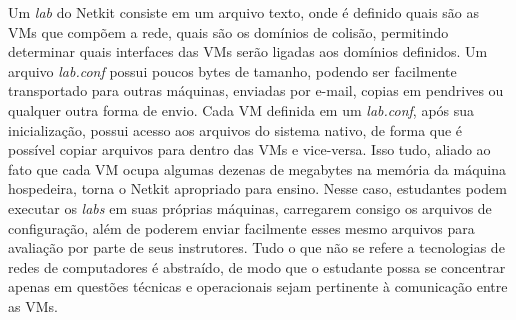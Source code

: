 \documentclass[	12pt, Times, openright, twoside, a4paper, english, brazil]{abntex2}
\begin{document}

Um \textit{lab} do Netkit consiste em um arquivo texto, onde é definido quais são as VMs que compõem a rede, quais são os domínios de colisão, permitindo determinar quais interfaces das VMs serão ligadas aos domínios definidos. Um arquivo  \textit{lab.conf} possui poucos bytes de tamanho, podendo ser facilmente transportado para outras máquinas, enviadas por e-mail, copias em pendrives ou qualquer outra forma de envio. Cada VM definida em um \textit{lab.conf}, após sua inicialização, possui acesso aos arquivos do sistema nativo, de forma que é possível copiar arquivos para dentro das VMs e vice-versa. Isso tudo, aliado ao fato que cada VM ocupa algumas dezenas de megabytes na memória da máquina hospedeira, torna o Netkit apropriado para ensino. Nesse caso, estudantes podem executar os \textit{labs} em suas próprias máquinas, carregarem consigo os arquivos de configuração, além de poderem enviar facilmente esses mesmo arquivos para avaliação por parte de seus instrutores. Tudo o que não se refere a tecnologias de redes de computadores é abstraído, de modo que o estudante possa se concentrar apenas em questões técnicas e operacionais sejam pertinente à comunicação entre as VMs.
\end{document}
